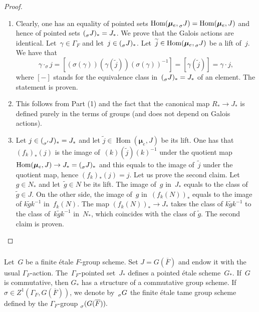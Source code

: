 \documentclass[a4paper,english,12pt]{amsart}
\newcommand{\oF}{\overline F}
\newcommand{\sG}{\prescript{}{\sigma}G}
\newcommand{\muu}{\boldsymbol{\mu}}
\DeclareMathOperator{\Hom}{Hom}
\numberwithin{equation}{subsection}
\begin{document}
\begin{proof}
\begin{enumerate}
\item Clearly, one has an equality of pointed sets $\Hom(\muu_e, \prescript{}{\sigma}J)=\Hom(\muu_e, J)$ and hence of pointed sets $(\prescript{}{\sigma}J)_*=J_*$. We prove that the Galois actions are identical. Let~$\gamma\in\Gamma_F$ and let~$j\in (\prescript{}{\sigma}J)_*$. Let~$\widetilde j\in \Hom(\muu_e, \prescript{}{\sigma}J)$ be a lift of~$j$. We have that $$\gamma\cdot_{\sigma} j=[(\sigma(\gamma))(\gamma(\widetilde j))(\sigma(\gamma))^{-1}]=[\gamma(\widetilde j)]=\gamma\cdot j,$$where %
$[-]$ stands for the equivalence class in~$(\prescript{}{\sigma}J)_*=J_*$ of an element. The statement is proven.
\item This follows from Part (1) and the fact that the canonical map $R_*\to J_*$ is defined purely in the terms of groups (and does not depend on Galois actions). %
\item Let $j\in (\prescript{}{\sigma'}J)_*=J_*$ and let $\widetilde j\in \Hom(\muu_e,J)$ be its lift. One has that~$(f_k)_*(j)$ is the image of~$(k)(\widetilde j)(k)^{-1}$ under the quotient map $\Hom(\muu_e, J)\to J_*=(\prescript{}{\sigma}J)_*$ and this equals to the image of~$\widetilde j$ under the quotient map, hence $(f_k)_*(j)=j$. Let us prove the second claim. Let $g\in N_*$ and let~$\widetilde g\in N$ be its lift. The image of~$g$ in~$J_*$ equals to the class of~$\widetilde g\in J$. On the other side, the image of~$g$ in~$(f_k(N))_*$ equals to the image of $k\widetilde gk^{-1}$ in~$f_k(N)$. The map $(f_k(N))_*\to J_*$ takes the class of $k\widetilde gk^{-1}$ to the class of~$k\widetilde gk^{-1}$ in~$N_*$, which coincides with the class of $\widetilde g$. The second claim is proven.
\end{enumerate}
\end{proof}
\subsubsection{}Let~$G$ be a finite \' etale $F$-group scheme. Set $J=G(\oF)$ and endow it with the usual $\Gamma_F$-action. The~$\Gamma_F$-pointed set~$J_*$ defines a pointed \' etale scheme~$G_*$. If~$G$ is commutative, then $G_*$ has a structure of a commutative group scheme.  If $\sigma\in Z^1(\Gamma_F, G(\oF))$, we denote by~$\sG$ the finite \' etale tame group scheme defined by the $\Gamma_F$-group $\prescript{}{\sigma}(G(\oF)).$
\end{document}
